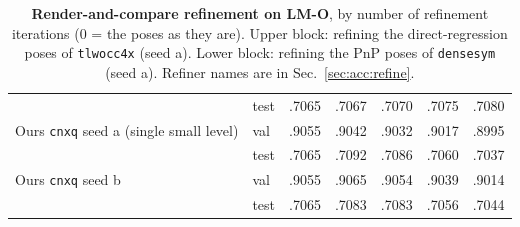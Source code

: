 \begin{table}[t]
\begin{tabular}{@{}llccccc@{}}
     & test & .7065 & .7067 & .7070 & .7075 & .7080 \\
    Ours \texttt{cnxq} seed a (single small level) & val & .9055 & .9042 & .9032 & .9017 & .8995 \\
     & test & .7065 & .7092 & .7086 & .7060 & .7037 \\
    Ours \texttt{cnxq} seed b & val & .9055 & .9065 & .9054 & .9039 & .9014 \\
     & test & .7065 & .7083 & .7083 & .7056 & .7044 \\
    \bottomrule
  \end{tabular}
  \caption{\textbf{Render-and-compare refinement on LM-O}, by number of refinement iterations (0 = the poses as they are). Upper block: refining the direct-regression poses of \texttt{tlwocc4x} (seed a). Lower block: refining the PnP poses of \texttt{densesym} (seed a). Refiner names are in Sec.~\ref{sec:acc:refine}.}
  \label{tab:cat_refine}
\end{table}

